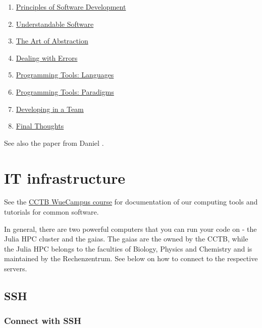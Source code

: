 \documentclass[
]{book}
\begin{document}
\begin{enumerate}
\def\labelenumi{\arabic{enumi}.}
\item
  \href{https://terranostra.one/posts/Principles-of-Software-Development.html}{Principles of Software
  Development}
\item
  \href{https://terranostra.one/posts/Understandable-Software.html}{Understandable
  Software}
\item
  \href{https://terranostra.one/posts/The-Art-of-Abstraction.html}{The Art of
  Abstraction}
\item
  \href{https://terranostra.one/posts/Dealing-with-Errors.html}{Dealing with
  Errors}
\item
  \href{https://terranostra.one/posts/Programming-tools-languages.html}{Programming Tools:
  Languages}
\item
  \href{https://terranostra.one/posts/Programming-tools-paradigms.html}{Programming Tools:
  Paradigms}
\item
  \href{https://terranostra.one/posts/Developing-in-a-team.html}{Developing in a
  Team}
\item
  \href{https://terranostra.one/posts/Some-final-thoughts-on-programming.html}{Final
  Thoughts}
\end{enumerate}

See also the paper from Daniel \citep{vedder2021}.

\chapter{IT infrastructure}\label{it-infrastructure}

See the \href{https://wuecampus2.uni-wuerzburg.de/moodle/course/view.php?id=40523}{CCTB WueCampus
course}
for documentation of our computing tools and tutorials for common
software.

In general, there are two powerful computers that you can run your code
on - the Julia HPC cluster and the gaias. The gaias are the owned by the
CCTB, while the Julia HPC belongs to the faculties of Biology, Physics
and Chemistry and is maintained by the Rechenzentrum. See below on how
to connect to the respective servers.

\section{SSH}\label{ssh}

\subsection{Connect with SSH}\label{connect-with-ssh}
\end{document}
